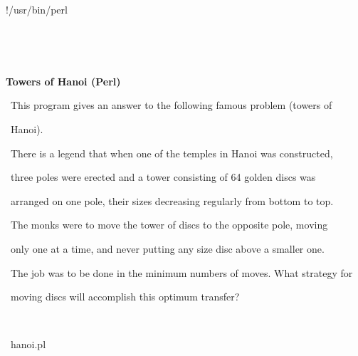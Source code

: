 \documentclass[a4paper,10pt]{article}
\def\mc{\relax}
\begin{document}
\tt\mc 

\noindent
\mbox{}\rm\mc {\tt\#}!/usr/bin/perl
\tt\mc 

\noindent
\mbox{}\rm\mc {\tt\#} \hrulefill 
\tt\mc 

\noindent
\mbox{}\rm\mc {\tt\#} \ %
\tt\mc 

\noindent
\mbox{}\rm\mc {\tt\#} \ \centerline{\bf Towers of Hanoi (Perl)} 
\tt\mc 

\noindent
\mbox{}\rm\mc {\tt\#}  
\tt\mc 

\noindent
\mbox{}\rm\mc {\tt\#} \ \hspace{\leftmargini}This program gives an answer to the following famous problem (towers of 
\tt\mc 

\noindent
\mbox{}\rm\mc {\tt\#} \ \hspace{\leftmargini}Hanoi). 
\tt\mc 

\noindent
\mbox{}\rm\mc {\tt\#} \ \hspace{\leftmargini}There is a legend that when one of the temples in Hanoi was constructed, 
\tt\mc 

\noindent
\mbox{}\rm\mc {\tt\#} \ \hspace{\leftmargini}three poles were erected and a tower consisting of 64 golden discs was 
\tt\mc 

\noindent
\mbox{}\rm\mc {\tt\#} \ \hspace{\leftmargini}arranged on one pole, their sizes decreasing regularly from bottom to top. 
\tt\mc 

\noindent
\mbox{}\rm\mc {\tt\#} \ \hspace{\leftmargini}The monks were to move the tower of discs to the opposite pole, moving 
\tt\mc 

\noindent
\mbox{}\rm\mc {\tt\#} \ \hspace{\leftmargini}only one at a time, and never putting any size disc above a smaller one. 
\tt\mc 

\noindent
\mbox{}\rm\mc {\tt\#} \ \hspace{\leftmargini}The job was to be done in the minimum numbers of moves. What strategy for 
\tt\mc 

\noindent
\mbox{}\rm\mc {\tt\#} \ \hspace{\leftmargini}moving discs will accomplish this optimum transfer? 
\tt\mc 

\noindent
\mbox{}\rm\mc {\tt\#}  \ %
\tt\mc 

\noindent
\mbox{}\rm\mc {\tt\#} \hrulefill\ hanoi.pl \ \hrulefill
\tt\mc 
\end{document}

